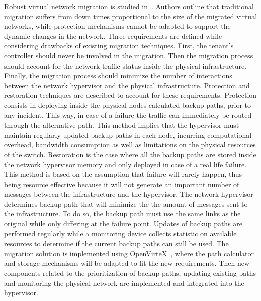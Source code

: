 Robust virtual network migration is studied in~\cite{Ko2017c}. Authors outline that traditional migration suffers from down times proportional to the size of the migrated virtual networks, while protection mechanisms cannot be adapted to support the dynamic changes in the network.
Three requirements are defined while considering drawbacks of existing migration techniques. 
First, the tenant's controller should never be involved in the migration.
Then the migration process should account for the network traffic status inside the physical infrastructure.
Finally, the migration process should minimize the number of interactions between the network hypervisor and the physical infrastructure.
Protection and restoration techniques are described to account for these requirements.
Protection consists in deploying inside the physical nodes calculated backup paths, prior to any incident.
This way, in case of a failure the traffic can immediately be routed through the alternative path. 
This method implies that the hypervisor must maintain regularly updated backup paths in each node, incurring computational overhead, bandwidth consumption as well as limitations on the physical resources of the switch.
Restoration is the case where all the backup paths are stored inside the network hypervisor memory and only deployed in case of a real life failure.
This method is based on the assumption that failure will rarely happen, thus being resource effective because it will not generate an important number of messages between the infrastructure and the hypervisor.
The network hypervisor determines backup path that will minimize the the amount of messages sent to the infrastructure.
To do so, the backup path must use the same links as the original while only differing at the failure point.
Updates of backup paths are performed regularly while a monitoring device collects statistic on available resources to determine if the current backup paths can still be used.
The migration solution is implemented using OpenVirteX~\cite{OpenVirteX-Al-Shabibi2014}, where the path calculator and storage mechanisms will be adapted to fit the new requirements. Then new components related to the prioritization of backup paths, updating existing paths and monitoring the physical network are implemented and integrated into the hypervisor.

